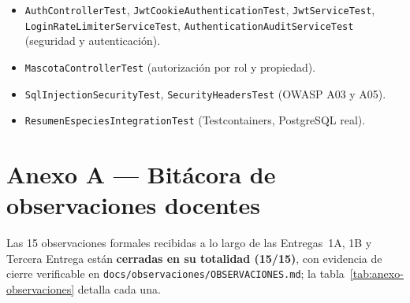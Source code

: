 \small
\begin{itemize}[nosep]
  \item \texttt{AuthControllerTest}, \texttt{JwtCookie\allowbreak AuthenticationTest},
    \texttt{JwtServiceTest}, \texttt{LoginRate\allowbreak LimiterServiceTest},
    \texttt{Authentication\allowbreak AuditServiceTest} (seguridad y autenticaci\'on).
  \item \texttt{MascotaControllerTest} (autorizaci\'on por rol y propiedad).
  \item \texttt{SqlInjectionSecurityTest}, \texttt{SecurityHeadersTest}
    (OWASP A03 y A05).
  \item \texttt{Resumen\allowbreak Especies\allowbreak IntegrationTest} (Testcontainers, PostgreSQL real).
\end{itemize}
\normalsize

\section{Anexo A --- Bit\'acora de observaciones docentes}
\label{sec:anexo-observaciones}

Las 15 observaciones formales recibidas a lo largo de las Entregas~1A,
1B y Tercera Entrega est\'an \textbf{cerradas en su totalidad (15/15)},
con evidencia de cierre verificable en
\texttt{docs/observaciones/OBSERVACIONES.md}; la
tabla~\ref{tab:anexo-observaciones} detalla cada una.


